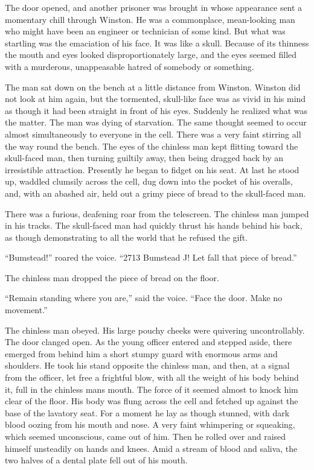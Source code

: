 The door opened, and another prisoner was brought in whose appearance
sent a momentary chill through Winston. He was a commonplace,
mean-looking man who might have been an engineer or technician of some
kind. But what was startling was the emaciation of his face. It was like
a skull. Because of its thinness the mouth and eyes looked
disproportionately large, and the eyes seemed filled with a murderous,
unappeasable hatred of somebody or something.

The man sat down on the bench at a little distance from Winston. Winston
did not look at him again, but the tormented, skull-like face was as
vivid in his mind as though it had been straight in front of his eyes.
Suddenly he realized what was the matter. The man was dying of
starvation. The same thought seemed to occur almost simultaneously to
everyone in the cell. There was a very faint stirring all the way round
the bench. The eyes of the chinless man kept flitting toward the
skull-faced man, then turning guiltily away, then being dragged back by
an irresistible attraction. Presently he began to fidget on his seat. At
last he stood up, waddled clumsily across the cell, dug down into the
pocket of his overalls, and, with an abashed air, held out a grimy piece
of bread to the skull-faced man.

There was a furious, deafening roar from the telescreen. The chinless
man jumped in his tracks. The skull-faced man had quickly thrust his
hands behind his back, as though demonstrating to all the world that he
refused the gift.

``Bumstead!'' roared the voice. ``2713 Bumstead J! Let fall that piece of
bread.''

The chinless man dropped the piece of bread on the floor.

``Remain standing where you are,'' said the voice. ``Face the door. Make no
movement.''

The chinless man obeyed. His large pouchy cheeks were quivering
uncontrollably. The door clanged open. As the young officer entered and
stepped aside, there emerged from behind him a short stumpy guard with
enormous arms and shoulders. He took his stand opposite the chinless
man, and then, at a signal from the officer, let free a frightful blow,
with all the weight of his body behind it, full in the chinless
man\textquotesingle s mouth. The force of it seemed almost to knock him
clear of the floor. His body was flung across the cell and fetched up
against the base of the lavatory seat. For a moment he lay as though
stunned, with dark blood oozing from his mouth and nose. A very faint
whimpering or squeaking, which seemed unconscious, came out of him. Then
he rolled over and raised himself unsteadily on hands and knees. Amid a
stream of blood and saliva, the two halves of a dental plate fell out of
his mouth.


